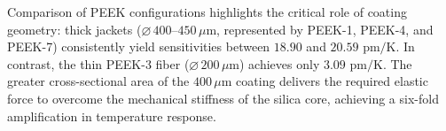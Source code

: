 \documentclass[preprint,11pt]{elsarticle}
\begin{document}
Comparison of PEEK configurations highlights the critical role of coating geometry: thick jackets ($\varnothing\,400\text{--}450\,\mu\text{m}$, represented by PEEK-1, PEEK-4, and PEEK-7) consistently yield sensitivities between $18.90$ and $20.59\text{ pm/K}$. In contrast, the thin PEEK-3 fiber ($\varnothing\,200\,\mu\text{m}$) achieves only $3.09\text{ pm/K}$. The greater cross-sectional area of the $400\,\mu\text{m}$ coating delivers the required elastic force to overcome the mechanical stiffness of the silica core, achieving a six-fold amplification in temperature response.


    
    
\end{document}
